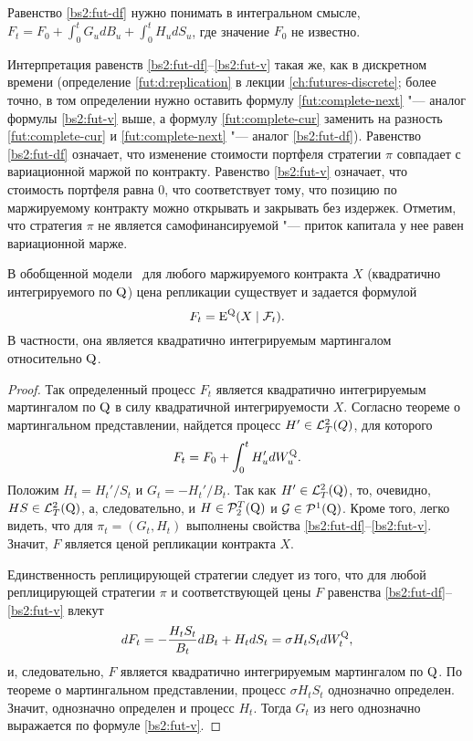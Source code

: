 \begin{remark}
Равенство \eqref{bs2:fut-df} нужно понимать в интегральном смысле, \te\ $F_t = F_0 + \int_0^t G_u dB_u + \int_0^t H_u d S_u$, где значение $F_0$ не известно.
\end{remark}

Интерпретация равенств \eqref{bs2:fut-df}--\eqref{bs2:fut-v} такая же, как в дискретном времени (определение \ref{fut:d:replication} в лекции \ref{ch:futures-discrete}; более точно, в том определении нужно оставить формулу \eqref{fut:complete-next} "--- аналог формулы \eqref{bs2:fut-v} выше, а формулу \eqref{fut:complete-cur} заменить на разность \eqref{fut:complete-cur} и \eqref{fut:complete-next} "--- аналог \eqref{bs2:fut-df}).
Равенство \eqref{bs2:fut-df} означает, что изменение стоимости портфеля стратегии $\pi$ совпадает с вариационной маржой по контракту.
Равенство \eqref{bs2:fut-v} означает, что стоимость портфеля равна 0, что соответствует тому, что позицию по маржируемому контракту можно открывать и закрывать без издержек.
Отметим, что стратегия $\pi$ не является самофинансируемой "--- приток капитала у нее равен вариационной марже.

\begin{proposition}
В обобщенной модели \bs\ для любого маржируемого контракта $X$ (квадратично интегрируемого по $\mathrm{Q}$) цена репликации существует и задается формулой
\[
F_t = \operatorname{E}^{\mathrm{Q}} (X\mid \mathcal{F}_t).
\]
В частности, она является квадратично интегрируемым мартингалом относительно $\mathrm{Q}$. 
\end{proposition}

\begin{proof}
Так определенный процесс $F_t$ является квадратично интегрируемым мартингалом по $\mathrm{Q}$ в силу квадратичной интегрируемости $X$.
Согласно теореме о мартингальном представлении, найдется процесс $H'\in \mathcal{L}_T^2(Q)$, для которого 
\[
F_t = F_0 + \int_0^t H_u' d W_u^{\mathrm{Q}}.
\]
Положим $H_t = H_t'/S_t$ и $G_t = -H_t'/B_t$.
Так как $H'\in \mathcal{L}_T^2(\mathrm{Q})$, то, очевидно, $HS\in\mathcal{L}^2_T(\mathrm{Q})$, а, следовательно, и $H\in\mathcal{P}_2^T(\mathrm{Q})$ и $\mathcal{G}\in\mathcal{P}^1(\mathrm{Q})$.
Кроме того, легко видеть, что для $\pi_t=(G_t,H_t)$ выполнены свойства \eqref{bs2:fut-df}--\eqref{bs2:fut-v}.
Значит, $F$ является ценой репликации контракта $X$.

Единственность реплицирующей стратегии следует из того, что для любой реплицирующей стратегии $\pi$ и соответствующей цены $F$ равенства \eqref{bs2:fut-df}--\eqref{bs2:fut-v} влекут
\[
d F_t = -\frac{H_tS_t}{B_t}dB_t + H_tdS_t = \sigma H_t S_t dW_t^{\mathrm{Q}},
\]
и, следовательно, $F$ является квадратично интегрируемым мартингалом по $\mathrm{Q}$. По теореме о мартингальном представлении, процесс $\sigma H_t S_t$ однозначно определен.
Значит, однозначно определен и процесс $H_t$. Тогда $G_t$ из него однозначно выражается по формуле \eqref{bs2:fut-v}.
\end{proof}

